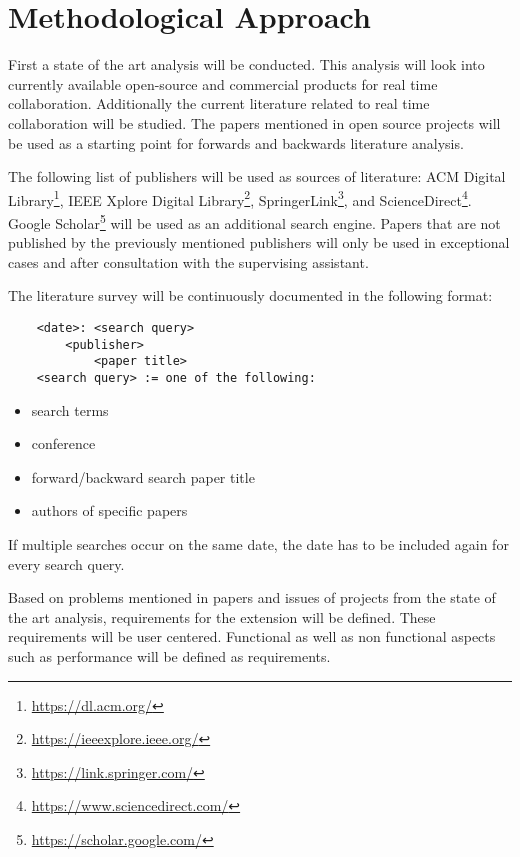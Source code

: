 \section{Methodological Approach}

First a state of the art analysis will be conducted. This analysis will look into currently available open-source and commercial products for real time collaboration. 
Additionally the current literature related to real time collaboration will be studied.
The papers mentioned in open source projects will be used as a starting point for forwards and backwards literature analysis.


The following list of publishers will be used as sources of literature: ACM Digital Library\footnote{\href{https://dl.acm.org/}{https://dl.acm.org/}}, IEEE Xplore Digital Library\footnote{\href{https://ieeexplore.ieee.org/}{https://ieeexplore.ieee.org/}}, SpringerLink\footnote{\href{https://link.springer.com/}{https://link.springer.com/}}, and ScienceDirect\footnote{\href{https://www.sciencedirect.com/}{https://www.sciencedirect.com/}}. Google Scholar\footnote{\href{https://scholar.google.com/}{https://scholar.google.com/}} will be used as an additional search engine. Papers that are not published by the previously mentioned publishers will only be used in exceptional cases and after consultation with the supervising assistant.


The literature survey will be continuously documented in the following format:

\begin{lstlisting}
	<date>: <search query>
		<publisher>
			<paper title>
	<search query> := one of the following:
\end{lstlisting}

\begin{itemize}
    \item search terms
    \item conference
    \item forward/backward search paper title
    \item authors of specific papers 
\end{itemize}
If multiple searches occur on the same date, the date has to be included again for every search query.

Based on problems mentioned in papers and issues of projects from the state of the art analysis, requirements for the extension will be defined.
These requirements will be user centered.
Functional as well as non functional aspects such as performance will be defined as requirements.

